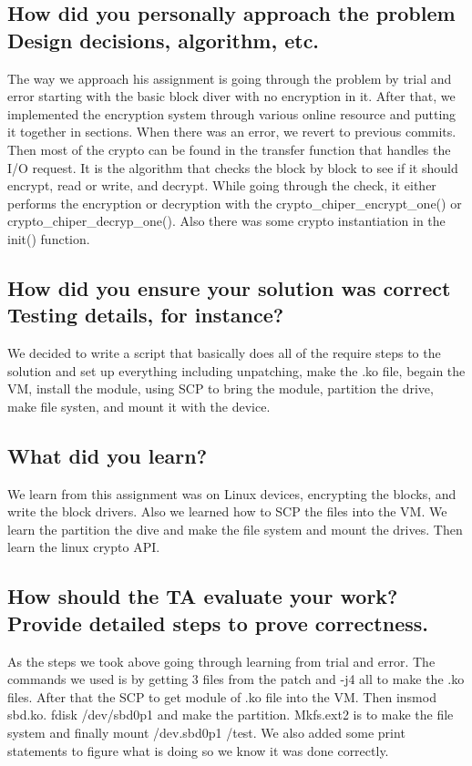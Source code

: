 \documentclass[onecolumn, draftclsnofoot, 10pt, titlepage, compsoc]{IEEEtran}
\begin{document}
\subsection{How did you personally approach the problem Design decisions, algorithm, etc.}

The way we approach his assignment is going through the problem by trial and error starting with the basic block diver with no encryption in it. After that, we implemented the encryption system through various online resource and putting it together in sections. When there was an error, we revert to previous commits. Then most of the crypto can be found in the transfer function that handles the I/O request. It is the algorithm that checks the block by block to see if it should encrypt, read or write, and decrypt. While going through the check, it either performs the encryption or decryption with the crypto\_chiper\_encrypt\_one() or crypto\_chiper\_decryp\_one(). Also there was some crypto instantiation in the init() function.\\

\subsection{How did you ensure your solution was correct Testing details, for instance?}

We decided to write a script that basically does all of the require steps to the solution and set up everything including unpatching, make the .ko file, begain the VM, install the module, using SCP to bring the module, partition the drive, make file systen, and mount it with the device.\\

\subsection{What did you learn?}

We learn from this assignment was on Linux devices, encrypting the blocks, and write the block drivers. Also we learned how to SCP the files into the VM. We learn the partition the dive and make the file system and mount the drives. Then learn the linux crypto API.\\

\subsection{How should the TA evaluate your work? Provide detailed steps to prove correctness.}
As the steps we took above going through learning from trial and error. The commands we used is by getting 3 files from the patch and -j4 all to make the .ko files. After that the SCP to get module of .ko file into the VM. Then insmod sbd.ko. fdisk /dev/sbd0p1 and make the partition. Mkfs.ext2 is to make the file system and finally mount /dev.sbd0p1 /test. We also added some print statements to figure what is doing so we know it was done correctly.\\

\nocite{*}


\end{document}

